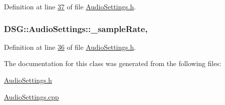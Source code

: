 Definition at line \hyperlink{_audio_settings_8h_source_l00037}{37} of file \hyperlink{_audio_settings_8h_source}{Audio\+Settings.\+h}.

\hypertarget{class_d_s_g_1_1_audio_settings_a56869b51933f102b197f54001c8a1d27}{
\subsubsection[{\+\_\+sample\+Rate}]{ D\+S\+G\+::\+Audio\+Settings\+::\+\_\+sample\+Rate\hspace{0.3cm}{\ttfamily [static]}, {\ttfamily [protected]}}}\label{class_d_s_g_1_1_audio_settings_a56869b51933f102b197f54001c8a1d27}


Definition at line \hyperlink{_audio_settings_8h_source_l00036}{36} of file \hyperlink{_audio_settings_8h_source}{Audio\+Settings.\+h}.



The documentation for this class was generated from the following files\+:\begin{DoxyCompactItemize}
\item 
\hyperlink{_audio_settings_8h}{Audio\+Settings.\+h}\item 
\hyperlink{_audio_settings_8cpp}{Audio\+Settings.\+cpp}\end{DoxyCompactItemize}
